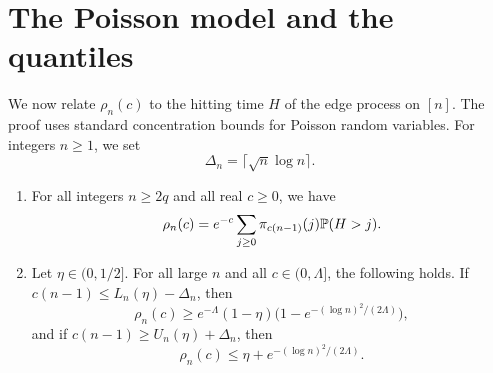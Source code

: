 \section{The Poisson model and the quantiles}\label{sec:conv-quantile}

We now relate $\rho_n(c)$ to the hitting time $H$ of the edge process on $[n]$. The proof uses standard concentration bounds for Poisson random variables. For integers $n \ge 1$, we set
\begin{equation}\label{eq:conv-Delta}
\Delta_n = \lceil \sqrt n \log n \rceil.
\end{equation}

\begin{lemma}\label{lem:conv-quantile}
\begin{enumerate}[label=(\alph*)]
\item For all integers $n \ge 2q$ and all real $c \ge 0$, we have
\begin{equation}\label{eq:conv-rho-H}
\rho_n(c) = e^{-c} \sum_{j \ge 0} \pi_{c(n - 1)}(j) \mathbb P(H > j).
\end{equation}
\item Let $\eta \in (0, 1/2]$. For all large $n$ and all $c \in (0, \Lambda]$, the following holds. If $c(n - 1) \le L_n(\eta) - \Delta_n$, then
\begin{equation}\label{eq:conv-below}
\rho_n(c) \ge e^{-\Lambda} (1 - \eta) \big(1 - e^{-(\log n)^2/(2\Lambda)}\big),
\end{equation}
and if $c(n - 1) \ge U_n(\eta) + \Delta_n$, then
\begin{equation}\label{eq:conv-above}
\rho_n(c) \le \eta + e^{-(\log n)^2/(2\Lambda)}.
\end{equation}
\end{enumerate}
\end{lemma}

